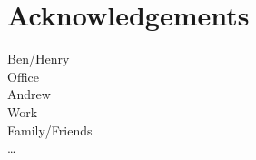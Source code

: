 
\chapter*{Acknowledgements}
\label{cha:ack}

Ben/Henry\\

Office\\

Andrew\\

Work\\

Family/Friends\\

\dots


